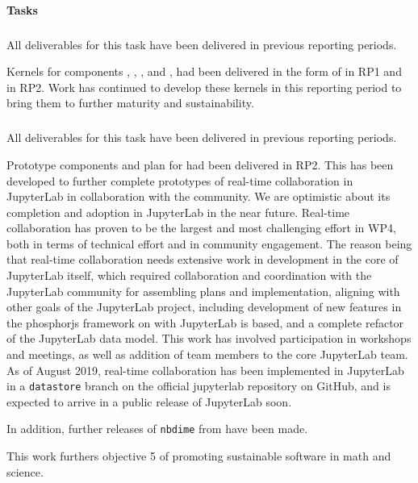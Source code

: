 \paragraph{Tasks}

\subparagraph{}
\label{UI@ipython-kernels}

All deliverables for this task have been delivered in previous reporting periods.

Kernels for \ODK components \GAP, \Pari, \Sage, and \Singular,
had been delivered in the form of 
in RP1 and  in RP2.
Work has continued to develop these kernels in this reporting period
to bring them to further maturity and sustainability.

\smallskip
\subparagraph{}
\label{UI@notebook-collab}

All deliverables for this task have been delivered in previous reporting periods.

Prototype components and plan for  had been delivered in RP2.
This has been developed to further complete prototypes of real-time collaboration in JupyterLab in collaboration with the \Jupyter community.
We are optimistic about its completion and adoption in JupyterLab in the near future.
Real-time collaboration has proven to be the largest and most challenging
effort in WP4,
both in terms of technical effort and in community engagement.
The reason being that real-time collaboration needs extensive work
in development in the core of JupyterLab itself,
which required collaboration and coordination with the JupyterLab community for assembling plans and implementation,
aligning with other goals of the JupyterLab project,
including development of new features in the phosphorjs framework on with JupyterLab is based,
and a complete refactor of the JupyterLab data model.
This work has involved participation in workshops and meetings,
as well as addition of \ODK team members to the core JupyterLab team.
As of August 2019, real-time collaboration has been implemented in JupyterLab in a \texttt{datastore} branch on the official jupyterlab repository on GitHub,
and is expected to arrive in a public release of JupyterLab soon.

In addition, further releases of \texttt{nbdime} from  have been made.

This work furthers \ODK objective 5 of promoting sustainable software in math and science.


